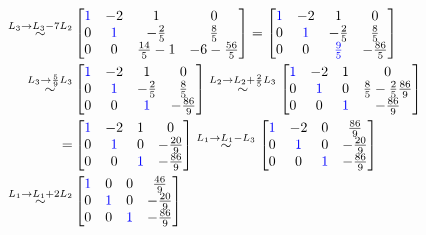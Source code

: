 \begin{exercice}
\begin{enumerate}
\begin{align*}
        \overset{L_3 \to L_3 - 7L_2}{\sim}
        &\begin{bmatrix}
        \color{blue}1 & -2 & 1 & 0\\
        0 & \color{blue}1 & -\frac{2}{5} & \frac{8}{5}\\
        0 & 0 & \frac{14}{5}-1 & -6-\frac{56}{5}
        \end{bmatrix}
        =
        \begin{bmatrix}
        \color{blue}1 & -2 & 1 & 0\\
        0 & \color{blue}1 & -\frac{2}{5} & \frac{8}{5}\\
        0 & 0 & \color{blue}\frac{9}{5} & -\frac{86}{5}
        \end{bmatrix}\\
        \overset{L_3 \to \frac{5}{9}L_3}{\sim}
        &\begin{bmatrix}
        \color{blue}1 & -2 & 1 & 0\\
        0 & \color{blue}1 & -\frac{2}{5} & \frac{8}{5}\\
        0 & 0 & \color{blue}1 & -\frac{86}{9}
        \end{bmatrix}
        \overset{L_2 \to L_2 + \frac{2}{5}L_3}{\sim}
        \begin{bmatrix}
        \color{blue}1 & -2 & 1 & 0\\
        0 & \color{blue}1 & 0 & \frac{8}{5} - \frac{2}{5}\frac{86}{9}\\
        0 & 0 & \color{blue}1 & -\frac{86}{9}
        \end{bmatrix}\\
        =
        &\begin{bmatrix}
        \color{blue}1 & -2 & 1 & 0\\
        0 & \color{blue}1 & 0 & -\frac{20}{9}\\
        0 & 0 & \color{blue}1 & -\frac{86}{9}
        \end{bmatrix}
        \overset{L_1 \to L_1 - L_3}{\sim}
        \begin{bmatrix}
        \color{blue}1 & -2 & 0 & \frac{86}{9}\\
        0 & \color{blue}1 & 0 & -\frac{20}{9}\\
        0 & 0 & \color{blue}1 & -\frac{86}{9}
        \end{bmatrix}\\
        \overset{L_1 \to L_1 + 2L_2}{\sim}
        &\begin{bmatrix}
        \color{blue}1 & 0 & 0 & \frac{46}{9}\\
        0 & \color{blue}1 & 0 & -\frac{20}{9}\\
        0 & 0 & \color{blue}1 & -\frac{86}{9}
        \end{bmatrix}
    \end{align*}\\


\end{enumerate}
\end{exercice}
